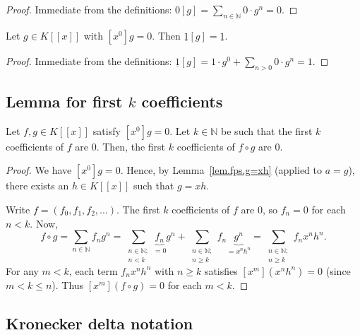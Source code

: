 \begin{proof}
\leanok
Immediate from the definitions: $0[g] = \sum_{n \in \mathbb{N}} 0 \cdot g^n = 0$.
\end{proof}

\begin{lemma}
\label{lem.fps.subs.one}
\leanhelper
\leanok
Let $g \in K[[x]]$ with $[x^0]g = 0$. Then $\underline{1}[g] = \underline{1}$.
\end{lemma}

\begin{proof}
\leanok
Immediate from the definitions: $\underline{1}[g] = 1 \cdot g^0 + \sum_{n > 0} 0 \cdot g^n = 1$.
\end{proof}

\subsection{Lemma for first $k$ coefficients}

\begin{lemma}
\label{lem.fps.fg-coeffs-0}
\leantarget
\leanok
Let $f, g \in K[[x]]$ satisfy $[x^0]g = 0$. Let $k \in \mathbb{N}$ be such
that the first $k$ coefficients of $f$ are $0$. Then, the first $k$
coefficients of $f \circ g$ are $0$.
\end{lemma}

\begin{proof}
\leanok
We have $[x^0]g = 0$. Hence, by Lemma~\ref{lem.fps.g=xh} (applied to
$a = g$), there exists an $h \in K[[x]]$ such that $g = xh$.

Write $f = (f_0, f_1, f_2, \ldots)$. The first $k$ coefficients of $f$
are $0$, so $f_n = 0$ for each $n < k$. Now,
\[
f \circ g = \sum_{n \in \mathbb{N}} f_n g^n
= \sum_{\substack{n \in \mathbb{N}; \\ n < k}} \underbrace{f_n}_{= 0} g^n
+ \sum_{\substack{n \in \mathbb{N}; \\ n \geq k}} f_n \underbrace{g^n}_{= x^n h^n}
= \sum_{\substack{n \in \mathbb{N}; \\ n \geq k}} f_n x^n h^n.
\]
For any $m < k$, each term $f_n x^n h^n$ with $n \geq k$ satisfies
$[x^m](x^n h^n) = 0$ (since $m < k \leq n$). Thus $[x^m](f \circ g) = 0$
for each $m < k$.
\end{proof}

\subsection{Kronecker delta notation}

